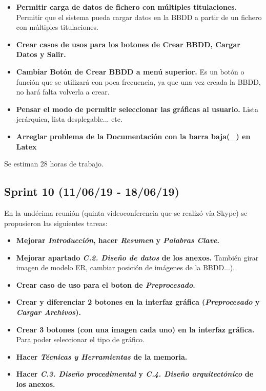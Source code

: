 \begin{itemize}
\item
\textbf{Permitir carga de datos de fichero con múltiples titulaciones.} Permitir que el sistema pueda cargar datos en la BBDD a partir de un fichero con múltiples titulaciones.
\item
\textbf{Crear casos de usos para los botones de Crear BBDD, Cargar Datos y Salir.}
\item
\textbf{Cambiar Botón de Crear BBDD a menú superior.} Es un botón o función que se utilizará con poca frecuencia, ya que una vez creada la BBDD, no hará falta volverla a crear.
\item
\textbf{Pensar el modo de permitir seleccionar las gráficas al usuario.} Lista jerárquica, lista desplegable... etc.
\item
\textbf{Arreglar problema de la Documentación con la barra baja(\_) en Latex}
\end{itemize}

Se estiman 28 horas de trabajo.

\subsection{Sprint 10 (11/06/19 - 18/06/19)}
En la undécima reunión (quinta videoconferencia que se realizó vía Skype) se propusieron las siguientes tareas:

\begin{itemize}
\item
\textbf{Mejorar \emph{Introducción}, hacer \emph{Resumen} y \emph{Palabras Clave}.}
\item
\textbf{Mejorar apartado \emph{C.2. Diseño de datos} de los anexos.} También girar imagen de modelo ER, cambiar posición de imágenes de la BBDD...).
\item
\textbf{Crear caso de uso para el boton de \emph{Preprocesado}.}
\item
\textbf{Crear y diferenciar 2 botones en la interfaz gráfica (\emph{Preprocesado} y \emph{Cargar Archivos}).} 
\item
\textbf{Crear 3 botones (con una imagen cada uno) en la interfaz gráfica.} Para poder seleccionar el tipo de gráfico.
\item
\textbf{Hacer \emph{Técnicas y Herramientas} de la memoria.}
\item
\textbf{Hacer \emph{C.3. Diseño procedimental} y \emph{C.4. Diseño arquitectónico} de los anexos.}
\end{itemize}

